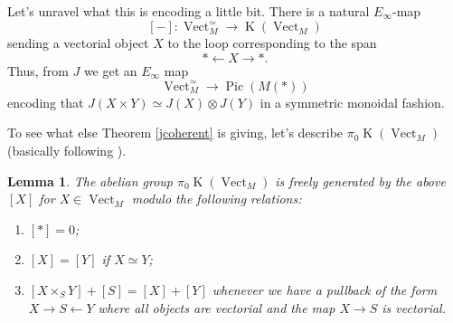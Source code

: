 \documentclass[12pt]{article}
\newtheorem{lemma}[theorem]{Lemma}
\newcommand{\on}{\operatorname}
\begin{document}
Let's unravel what this is encoding a little bit.  There is a natural $E_\infty$-map
$$[-]:\on{Vect}_M^\simeq \to \on{K}(\on{Vect}_M)$$
sending a vectorial object $X$ to the loop corresponding to the span
$$\ast \leftarrow X \rightarrow \ast.$$
Thus, from $J$ we get an $E_\infty$ map
$$\on{Vect}_M^\simeq \to \on{Pic}(M(\ast))$$
encoding that $J(X\times Y)\simeq J(X)\otimes J(Y)$ in a symmetric monoidal fashion.

To see what else Theorem \ref{jcoherent} is giving, let's describe $\pi_0\on{K}(\on{Vect}_M)$ (basically following \cite{QuillenQ}).

\begin{lemma}
The abelian group $\pi_0\on{K}(\on{Vect}_M)$ is freely generated by the above $[X]$ for $X\in\on{Vect}_M$ modulo the following relations:
\begin{enumerate}
\item $[\ast]=0$;
\item $[X]=[Y]$ if $X\simeq Y$;
\item $[X\times_S Y] + [S] = [X] + [Y]$
whenever we have a pullback of the form $X\to S\leftarrow Y$ where all objects are vectorial and the map $X\to S$ is vectorial.
\end{enumerate}
\end{lemma}
\end{document}
